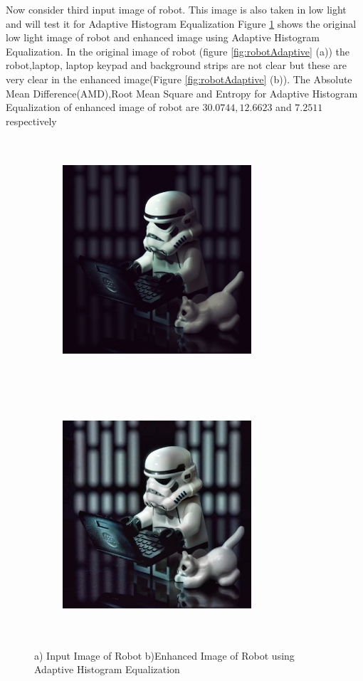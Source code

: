 Now consider third input image of robot. This image is also taken in low light and will test it for Adaptive Histogram Equalization Figure \ref{fig:robotAHE} shows the original low light image of robot and enhanced image using Adaptive Histogram Equalization. In the original image of robot (figure \ref{fig:robotAdaptive} (a))  the robot,laptop, laptop keypad and background strips are not clear but these are very clear in the enhanced image(Figure \ref{fig:robotAdaptive} (b)). The Absolute Mean Difference(AMD),Root Mean Square and Entropy for  Adaptive Histogram Equalization of enhanced image of robot are $30.0744, 12.6623$ and $7.2511$ respectively      



\begin{figure}[!htb]
	\begin{subfigure}{8cm}
		\centering    
    	\includegraphics[width=7cm,height=9cm,keepaspectratio]{images/ch5/robot_input.jpg}
    	\caption{} 
    \end{subfigure}
  	\begin{subfigure}{6cm}
  		\centering
  		\includegraphics[width=7cm,height=9cm,keepaspectratio]{images/ch5/robot_adapt_hist.jpg}
   		\caption{}
  	\end{subfigure}
  	\caption{a) Input Image of Robot b)Enhanced Image of Robot using Adaptive Histogram Equalization}
  	\label{fig:robotAHE}
\end{figure}


